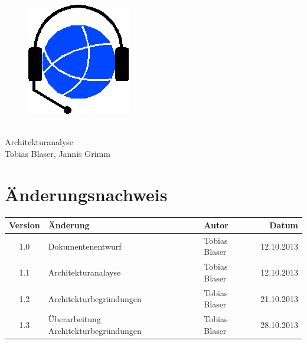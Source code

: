 

\providecommand{\documentType}{Architekturanalyse}
\providecommand{\versionnumber}{1.0}



\thispagestyle{empty}
\begin{titlepage}
	\begin{center}

	\vspace*{40mm}
	
	\begin{figure}[htp]
		\centering
		\includegraphics[scale=0.60]{../img/icon-js-voip.png}
	\end{figure}		
	\vspace*{20mm}
	
	{\fontsize{40}{48} \selectfont \project \\[10mm]}
	{\fontsize{40}{48} \selectfont \documentType \\[5mm]}	
	\vspace*{20mm}
	Tobias Blaser, Jannis Grimm

\end{center}
\end{titlepage}
\clearpage

\chapter*{Änderungsnachweis}
\begin{tabularx}{\textwidth}{|cXlr|} %
		\hline
		\textbf{Version} & \textbf{Änderung} & \textbf{Autor} & \textbf{Datum}\\
		\hline
		1.0 & Dokumentenentwurf & Tobias Blaser & 12.10.2013\\
		1.1 & Architekturanalayse & Tobias Blaser & 12.10.2013\\
		1.2 & Architekturbegründungen & Tobias Blaser & 21.10.2013\\
		1.3 & Überarbeitung Architekturbegründungen & Tobias Blaser & 28.10.2013\\
		\hline
\end{tabularx}

\tableofcontents






